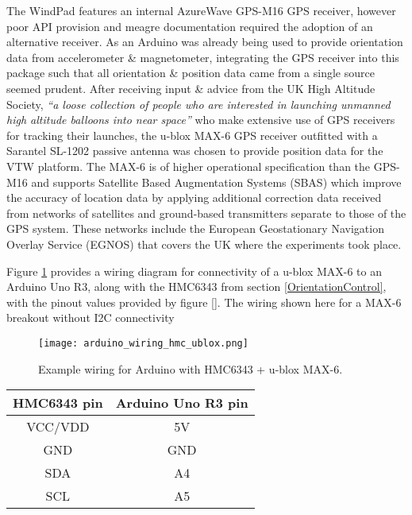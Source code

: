 The WindPad features an internal AzureWave GPS-M16 GPS receiver\azurewaveFootnote{}, however poor API provision and meagre documentation required the adoption of an alternative receiver. As an Arduino was already being used to provide orientation data from accelerometer \& magnetometer, integrating the GPS receiver into this package such that all orientation \& position data came from a single source seemed prudent. After receiving input \& advice from the UK High Altitude Society\habFootnote{}, \textit{``a loose collection of people who are interested in launching unmanned high altitude balloons into near space''} who make extensive use of GPS receivers for tracking their launches, the u-blox MAX-6\ubloxFootnote{} GPS receiver outfitted with a Sarantel SL-1202\sarantelFootnote{} passive antenna was chosen to provide position data for the VTW platform. The MAX-6 is of higher operational specification than the GPS-M16 and supports Satellite Based Augmentation Systems (SBAS) which improve the accuracy of location data by applying additional correction data received from networks of satellites and ground-based transmitters separate to those of the GPS system. These networks include the European Geostationary Navigation Overlay Service (EGNOS) that covers the UK where the experiments took place.

Figure \ref{arduino_wiring_hmc_ublox.png} provides a wiring diagram for connectivity of a u-blox MAX-6 to an Arduino Uno R3, along with the HMC6343 from section \ref{OrientationControl}, with the pinout values provided by figure \ref{}. The wiring shown here for a MAX-6 breakout without I2C connectivity

\begin{figure}[h]
\centering
  \texttt{[image: arduino\_wiring\_hmc\_ublox.png]}
  \caption{Example wiring for Arduino with HMC6343 + u-blox MAX-6.}
  \label{arduino_wiring_hmc_ublox.png}
\end{figure}






\begin{tabular}{| c | c |}

\hline	

\textbf{HMC6343 pin} & \textbf{Arduino Uno R3 pin} \\

\hline

VCC/VDD & 5V \\

\hline

GND & GND \\

\hline

SDA & A4 \\

\hline

SCL & A5 \\

\hline

\end{tabular}



